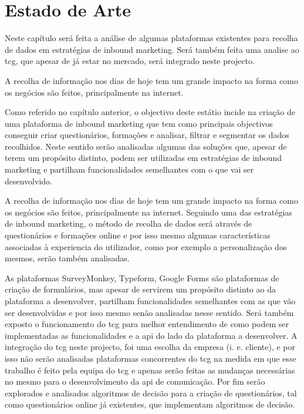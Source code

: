 \chapter{Estado de Arte}
\label{sec:estado-arte}

Neste capítulo será feita a análise de algumas plataformas existentes para recolha de dados em estratégias de inbound marketing. Será também feita uma analise ao \acrshort{tcg}, que apesar de já estar no mercado, será integrado neste projecto.

A recolha de informação nos dias de hoje tem um grande impacto na forma como os negócios são feitos, principalmente na internet.

Como referido no capítulo anterior, o objectivo deste estátio incide na criação de uma plataforma de inbound marketing que tem como principais objectivos conseguir criar questionários, formações e analisar, filtrar e segmentar os dados recolhidos. Neste sentido serão analisadas algumas das soluções que, apesar de terem um propósito distinto, podem ser utilizadas em estratégias de inbound marketing e partilham funcionalidades semelhantes com o que vai ser desenvolvido. 

A recolha de informação nos dias de hoje tem um grande impacto na forma como os negócios são feitos, principalmente na internet. Seguindo uma das estratégias de inbound marketing, o método de recolha de dados será através de questionários e formações online e por isso mesmo algumas características associadas à experiencia do utilizador, como por exemplo a personalização dos mesmos, serão também analisadas.


As plataformas SurveyMonkey\cite{surveymonkey}, Typeform\cite{typeform}, Google Forms\cite{googleform} são plataformas de criação de formulários, mas apesar de servirem um propósito distinto ao da plataforma a desenvolver, partilham funcionalidades semelhantes com as que vão ser desenvolvidas e por isso mesmo senão analisadas nesse sentido. Será também exposto o funcionamento do \acrshort{tcg} para melhor entendimento de como podem ser implementadas as funcionalidades e a \acrshort{api} do lado da plataforma a desenvolver. A integração do \acrshort{tcg} neste projecto, foi uma escolha da empresa (i. e. cliente), e por isso não serão analisadas plataformas concorrentes do \acrshort{tcg} na medida em que esse trabalho é feito pela equipa do \acrshort{tcg} e apenas serão feitas as mudanças necessárias no mesmo para o desenvolvimento da \acrshort{api} de comunicação. Por fim serão explorados e analisados algoritmos de decisão para a criação de questionários, tal como questionários online já existentes, que implementam algoritmos de decisão.

